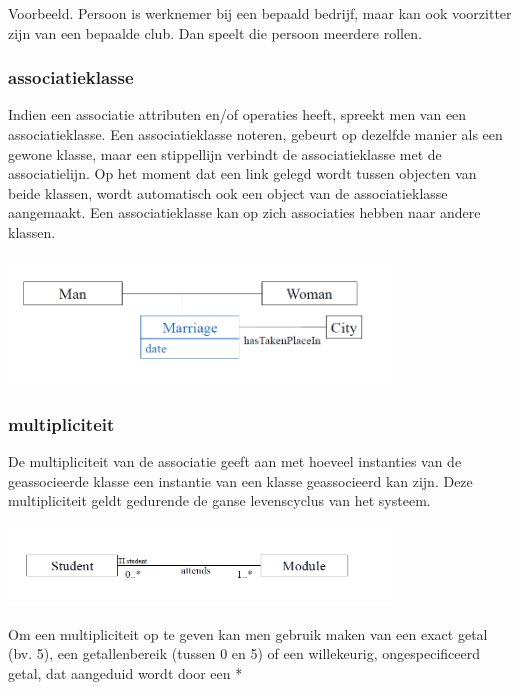 Voorbeeld. Persoon is werknemer bij een bepaald bedrijf, maar kan ook voorzitter zijn van een bepaalde club. Dan speelt die persoon meerdere rollen.

\subsubsection{associatieklasse}

Indien een associatie attributen en/of operaties heeft, spreekt men van een associatieklasse. Een associatieklasse noteren, gebeurt op dezelfde manier als een gewone klasse, maar een stippellijn verbindt de associatieklasse met de associatielijn. Op het moment dat een link gelegd wordt tussen objecten van beide klassen, wordt automatisch ook een object van de associatieklasse aangemaakt.
Een associatieklasse kan op zich associaties hebben naar andere klassen.


\begin{center}
\includegraphics[width=4in]{img/asscl1}%
\end{center}
\newpage
\subsubsection{multipliciteit}

De multipliciteit van de associatie geeft aan met hoeveel instanties van de geassocieerde klasse een instantie van een klasse geassocieerd kan zijn. Deze multipliciteit geldt gedurende de ganse levenscyclus van het systeem.


\begin{center}
\includegraphics[width=4in]{img/mul1}%
\end{center}

Om een multipliciteit op te geven kan men gebruik maken van een exact getal (bv. 5), een getallenbereik (tussen 0 en 5) of een willekeurig, ongespecificeerd getal, dat aangeduid wordt door een *

